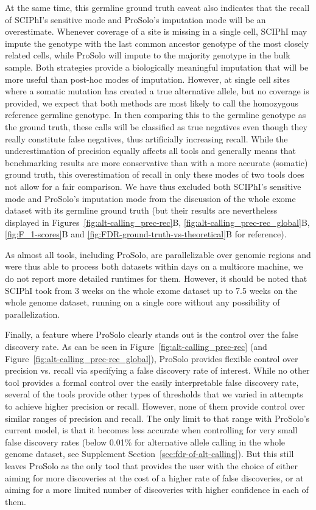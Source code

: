 \documentclass[12pt,inline]{wlscirep}
\begin{document}
At the same time, this germline ground truth caveat also indicates that the recall of SCIPhI's sensitive mode and ProSolo's imputation mode will be an overestimate.
Whenever coverage of a site is missing in a single cell, SCIPhI may impute the genotype with the last common ancestor genotype of the most closely related cells, while ProSolo will impute to the majority genotype in the bulk sample.
Both strategies provide a biologically meaningful imputation that will be more useful than post-hoc modes of imputation.
However, at single cell sites where a somatic mutation has created a true alternative allele, but no coverage is provided, we expect that both methods are most likely to call the homozygous reference germline genotype.
In then comparing this to the germline genotype as the ground truth, these calls will be classified as true negatives even though they really constitute false negatives, thus artificially increasing recall.
While the underestimation of precision equally affects all tools and generally means that benchmarking results are more conservative than with a more accurate (somatic) ground truth, this overestimation of recall in only these modes of two tools does not allow for a fair comparison.
We have thus excluded both SCIPhI's sensitive mode and ProSolo's imputation mode from the discussion of the whole exome dataset with its germline ground truth (but their results are nevertheless displayed in Figures~\ref{fig:alt-calling_prec-rec}B, \ref{fig:alt-calling_prec-rec_global}B, \ref{fig:F_1-scores}B and \ref{fig:FDR-ground-truth-vs-theoretical}B for reference).

As almost all tools, including ProSolo, are parallelizable over genomic regions and were thus able to process both datasets within days on a multicore machine, we do not report more detailed runtimes for them. However, it should be noted that SCIPhI took from 3 weeks on the whole exome dataset up to 7.5 weeks on the whole genome dataset, running on a single core without any possibility of parallelization.

Finally, a feature where ProSolo clearly stands out is the control over the false discovery rate.
As can be seen in Figure~\ref{fig:alt-calling_prec-rec} (and Figure~\ref{fig:alt-calling_prec-rec_global}), ProSolo provides flexible control over precision vs. recall via specifying a false discovery rate of interest.
While no other tool provides a formal control over the easily interpretable false discovery rate, several of the tools provide other types of thresholds that we varied in attempts to achieve higher precision or recall.
However, none of them provide control over similar ranges of precision and recall.
The only limit to that range with ProSolo's current model, is that it becomes less accurate when controlling for very small false discovery rates (below 0.01\% for alternative allele calling in the whole genome dataset, see Supplement Section~\ref{sec:fdr-of-alt-calling}).
But this still leaves ProSolo as the only tool that provides the user with the choice of either aiming for more discoveries at the cost of a higher rate of false discoveries, or at aiming for a more limited number of discoveries with higher confidence in each of them.
\end{document}
